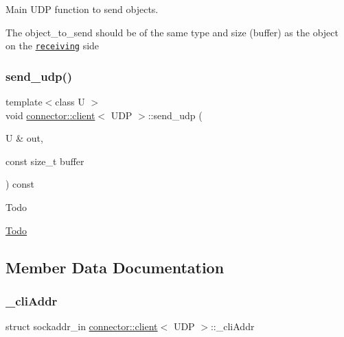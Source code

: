 Main U\+DP function to send objects. 

The {\ttfamily object\+\_\+to\+\_\+send} should be of the same type and size ({\ttfamily buffer}) as the object on the \href{classconnector_1_1receiver.html}{\tt receiving} side \mbox{\label{classconnector_1_1client_3_01UDP_01_4_adab4762b60763433e487ffe8296e3280}} 
\subsubsection{\texorpdfstring{send\+\_\+udp()}{send\_udp()}\hspace{0.1cm}{\footnotesize\ttfamily [2/2]}}
{\footnotesize\ttfamily template$<$class U $>$ \\
void \hyperlink{classconnector_1_1client}{connector\+::client}$<$ U\+DP $>$\+::send\+\_\+udp (\begin{DoxyParamCaption}\item[{U \&}]{out,  }\item[{const size\+\_\+t}]{buffer }\end{DoxyParamCaption}) const\hspace{0.3cm}{\ttfamily [inline]}}

\begin{DoxyRefDesc}{Todo}
\item[\hyperlink{todo__todo000006}{Todo}]\end{DoxyRefDesc}


\subsection{Member Data Documentation}
\mbox{\label{classconnector_1_1client_3_01UDP_01_4_ad60a6d56e9adfe9017aeb007f0274af3}} 
\subsubsection{\texorpdfstring{\+\_\+cli\+Addr}{\_cliAddr}}
{\footnotesize\ttfamily struct sockaddr\+\_\+in \hyperlink{classconnector_1_1client}{connector\+::client}$<$ U\+DP $>$\+::\+\_\+cli\+Addr\hspace{0.3cm}{\ttfamily [private]}}



